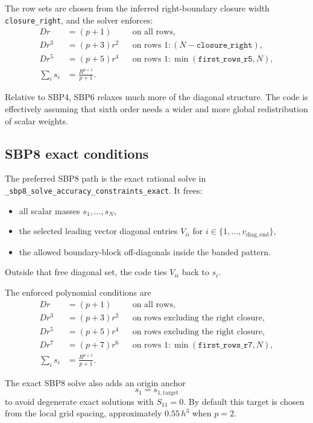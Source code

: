 \documentclass[
  aps,
  pre,
  reprint,
  superscriptaddress,
  nofootinbib
]{revtex4-2}
\begin{document}
The row sets are chosen from the inferred right-boundary closure width
\texttt{closure\_right}, and the solver enforces:
\begin{align}
  D r &= (p+1)
  && \text{on all rows}, \\
  D r^3 &= (p+3) r^2
  && \text{on rows } 1:(N-\texttt{closure\_right}), \\
  D r^5 &= (p+5) r^4
  && \text{on rows } 1:\min(\texttt{first\_rows\_r5},N), \\
  \sum_i s_i &= \frac{R^{p+1}}{p+1}.
\end{align}

Relative to SBP4, SBP6 relaxes much more of the diagonal structure.
The code is effectively assuming that sixth order needs a wider and more global
redistribution of scalar weights.

\subsection{SBP8 exact conditions}
The preferred SBP8 path is the exact rational solve in
\texttt{\_sbp8\_solve\_accuracy\_constraints\_exact}.
It frees:
\begin{itemize}
  \item all scalar masses $s_1,\dots,s_N$,
  \item the selected leading vector diagonal entries
  $V_{ii}$ for $i \in \{1,\dots,v_{\mathrm{diag,end}}\}$,
  \item the allowed boundary-block off-diagonals inside the banded pattern.
\end{itemize}
Outside that free diagonal set, the code ties $V_{ii}$ back to $s_i$.

The enforced polynomial conditions are
\begin{align}
  D r &= (p+1)
  && \text{on all rows}, \\
  D r^3 &= (p+3) r^2
  && \text{on rows excluding the right closure}, \\
  D r^5 &= (p+5) r^4
  && \text{on rows excluding the right closure}, \\
  D r^7 &= (p+7) r^6
  && \text{on rows } 1:\min(\texttt{first\_rows\_r7},N), \\
  \sum_i s_i &= \frac{R^{p+1}}{p+1}.
\end{align}

The exact SBP8 solve also adds an origin anchor
\begin{equation}
  s_1 = s_{1,\mathrm{target}}
\end{equation}
to avoid degenerate exact solutions with $S_{11}=0$.
By default this target is chosen from the local grid spacing,
approximately $0.55\,h^3$ when $p=2$.
\end{document}
